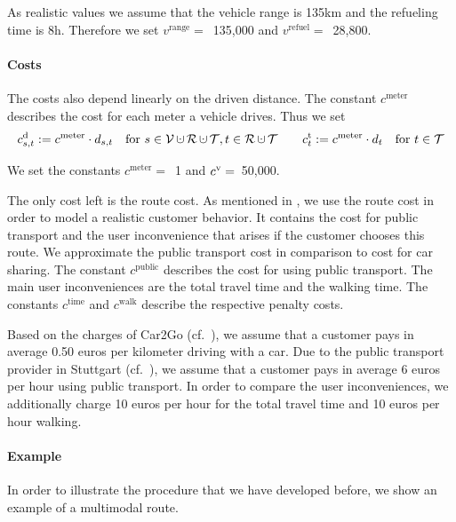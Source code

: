 As realistic values we assume that the vehicle range is 135km and the refueling time is 8h. Therefore we set ${v^{\operatorname{range}} =}$~135,000 and ${v^{\operatorname{refuel}} =}$~28,800.

\paragraph{Costs} \parfill

The costs also depend linearly on the driven distance. The constant $c^{\operatorname{meter}}$ describes the cost for each meter a vehicle drives. Thus we set
\begin{align*}
	\cd_{s,t} := c^{\operatorname{meter}}\cdot d_{s,t} && \text{for } s\in\mathcal{V}\cupdot\mathcal{R}\cupdot\mathcal{T}, t\in\mathcal{R}\cupdot\mathcal{T} && && \ct_t := c^{\operatorname{meter}}\cdot d_t && \text{for } t\in\mathcal{T}
\end{align*}

We set the constants ${c^{\operatorname{meter}} =}$~1 and ${c^{\operatorname{v}} =}$~50,000.

The only cost left is the route cost. As mentioned in , we use the route cost in order to model a realistic customer behavior. It contains the cost for public transport and the user inconvenience that arises if the customer chooses this route. We approximate the public transport cost in comparison to cost for car sharing. The constant $c^{\operatorname{public}}$ describes the cost for using public transport. The main user inconveniences are the total travel time and the walking time. The constants $c^{\operatorname{time}}$ and $c^{\operatorname{walk}}$ describe the respective penalty costs.

Based on the charges of Car2Go (cf.~\cite{Car2Go}), we assume that a customer pays in average 0.50 euros per kilometer driving with a car. Due to the public transport provider in Stuttgart (cf.~\cite{VVS}), we assume that a customer pays in average 6 euros per hour using public transport. In order to compare the user inconveniences, we additionally charge 10 euros per hour for the total travel time and 10 euros per hour walking.

\paragraph{Example} \parfill

In order to illustrate the procedure that we have developed before, we show an example of a multimodal route.

